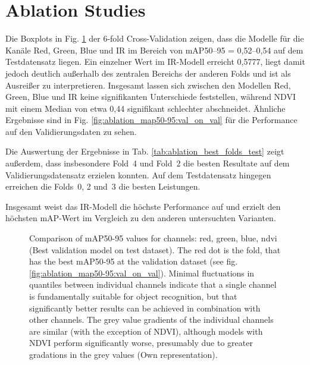 \section{Ablation Studies}
Die Boxplots in Fig. \ref{fig:ablation_map50-95:val_on_test} der 6-fold Cross-Validation zeigen, dass die Modelle für die Kanäle Red, Green, Blue und IR im Bereich von mAP50–95 = 0,52–0,54 auf dem Testdatensatz liegen. Ein einzelner Wert im IR-Modell erreicht 0,5777, liegt damit jedoch deutlich außerhalb des zentralen Bereichs der anderen Folds und ist als Ausreißer zu interpretieren. Insgesamt lassen sich zwischen den Modellen Red, Green, Blue und IR keine signifikanten Unterschiede feststellen, während NDVI mit einem Median von etwa 0,44 signifikant schlechter abschneidet. Ähnliche Ergebnisse sind in Fig. \ref{fig:ablation_map50-95:val_on_val} für die Performance auf den Validierungsdaten zu sehen.

Die Auswertung der Ergebnisse in Tab. \ref{tab:ablation_best_folds_test} zeigt außerdem, dass insbesondere Fold~4 und Fold~2 die besten Resultate auf dem Validierungsdatensatz erzielen konnten. Auf dem Testdatensatz hingegen erreichen die Folds~0, 2 und~3 die besten Leistungen.  

Insgesamt weist das IR-Modell die höchste Performance auf und erzielt den höchsten \acrshort{mAP}-Wert im Vergleich zu den anderen untersuchten Varianten.  




\begin{figure}[htbp]
    \centering
    
    \caption[Comparison of \acrshort{mAP}50-95 values for channels: red, green, blue, ndvi (Best validation model on test dataset)]{Comparison of \acrshort{mAP}50-95 values for channels: red, green, blue, ndvi (Best validation model on test dataset). The red dot is the fold, that has the best \acrshort{mAP}50-95 at the validation dataset (see fig. \ref{fig:ablation_map50-95:val_on_val}). Minimal fluctuations in quantiles between individual channels indicate that a single channel is fundamentally suitable for object recognition, but that significantly better results can be achieved in combination with other channels. The grey value gradients of the individual channels are similar (with the exception of NDVI), although models with NDVI perform significantly worse, presumably due to greater gradations in the grey values (Own representation).}
    \label{fig:ablation_map50-95:val_on_test}
\end{figure}


